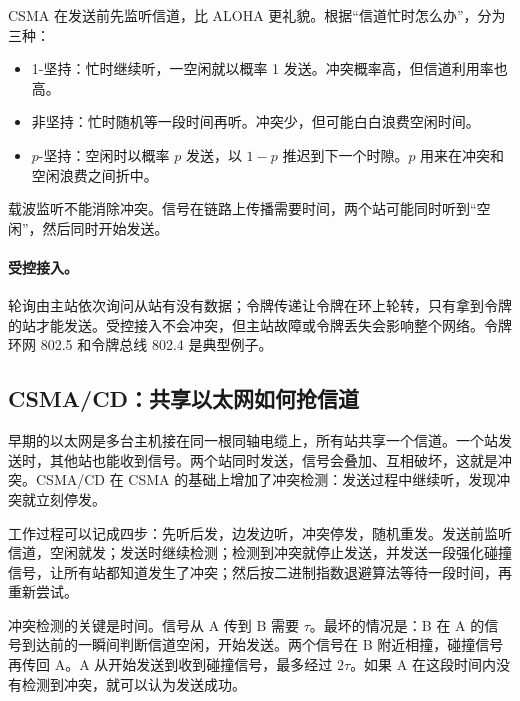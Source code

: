 CSMA 在发送前先监听信道，比 ALOHA 更礼貌。根据“信道忙时怎么办”，分为三种：
\begin{itemize}
  \item 1-坚持：忙时继续听，一空闲就以概率 1 发送。冲突概率高，但信道利用率也高。
  \item 非坚持：忙时随机等一段时间再听。冲突少，但可能白白浪费空闲时间。
  \item $p$-坚持：空闲时以概率 $p$ 发送，以 $1-p$ 推迟到下一个时隙。$p$ 用来在冲突和空闲浪费之间折中。
\end{itemize}
载波监听不能消除冲突。信号在链路上传播需要时间，两个站可能同时听到“空闲”，然后同时开始发送。

\paragraph{受控接入。}轮询由主站依次询问从站有没有数据；令牌传递让令牌在环上轮转，只有拿到令牌的站才能发送。受控接入不会冲突，但主站故障或令牌丢失会影响整个网络。令牌环网 802.5 和令牌总线 802.4 是典型例子。

\subsection{CSMA/CD：共享以太网如何抢信道}

早期的以太网是多台主机接在同一根同轴电缆上，所有站共享一个信道。一个站发送时，其他站也能收到信号。两个站同时发送，信号会叠加、互相破坏，这就是冲突。CSMA/CD 在 CSMA 的基础上增加了冲突检测：发送过程中继续听，发现冲突就立刻停发。

工作过程可以记成四步：先听后发，边发边听，冲突停发，随机重发。发送前监听信道，空闲就发；发送时继续检测；检测到冲突就停止发送，并发送一段强化碰撞信号，让所有站都知道发生了冲突；然后按二进制指数退避算法等待一段时间，再重新尝试。

冲突检测的关键是时间。信号从 A 传到 B 需要 $\tau$。最坏的情况是：B 在 A 的信号到达前的一瞬间判断信道空闲，开始发送。两个信号在 B 附近相撞，碰撞信号再传回 A。A 从开始发送到收到碰撞信号，最多经过 $2\tau$。如果 A 在这段时间内没有检测到冲突，就可以认为发送成功。

